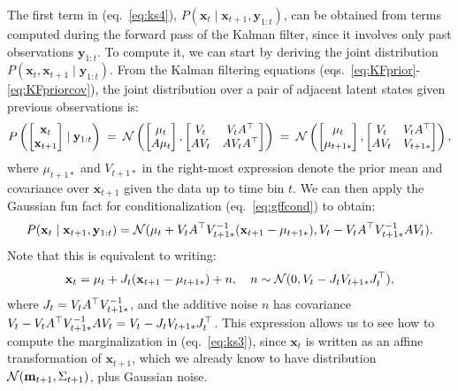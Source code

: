 \documentclass[10pt]{article}
\newcommand{\vx}{\mathbf{x}}
\newcommand{\vxto}{\mathbf{x}_{t+1}}
\newcommand{\vy}{\mathbf{y}}
\newcommand{\vm}{\mathbf{m}}
\begin{document}
The first term in (eq.~\ref{eq:ks4}),
$P(\vx_t \mid \vx_{t+1}, \vy_{1:t})$, can be obtained from terms
computed during the forward pass of the Kalman filter, since it
involves only past observations $\vy_{1:t}$.  To compute it, we can
start by deriving the joint distribution
$P(\vx_{t}, \vx_{t+1} \mid \vy_{1:t})$.  From the Kalman filtering
equations (eqs.~\ref{eq:KFprior}-\ref{eq:KFpriorcov}), the joint
distribution over a pair of adjacent latent states given previous
observations is:
\begin{align}
  \label{eq:8}
  P \left( \begin{bmatrix}
    \vx_t \\
    \vxto
  \end{bmatrix} \mid \vy_{1:t} \right) 
    \; = \; \Nrm \left(
  \begin{bmatrix}
    \mu_t \\ A \mu_t 
  \end{bmatrix}, 
  \begin{bmatrix}
    V_t & V_t A\trp \\
    A V_t & A V_t A\trp
   \end{bmatrix} \right)
\;  =\; \Nrm \left(
  \begin{bmatrix}
    \mu_t \\ \mu_{t+1*} 
  \end{bmatrix}, 
  \begin{bmatrix}
    V_t & V_t A\trp \\
    A V_t & V_{t+1*}
  \end{bmatrix} \right),
%
\end{align}
where $\mu_{t+1*}$ and $V_{t+1*}$ in the right-most expression denote
the prior mean and covariance over $\vxto$ given the data up to time
bin $t$. We can then apply the Gaussian fun fact for
conditionalization (eq.~\ref{eq:gffcond}) to obtain:
\begin{equation}
  \label{eq:7}
  P(\vx_t \mid \vxto, \vy_{1:t} )  = \Nrm( \mu_t + V_t A\trp
  V_{t+1*}\inv (\vxto - \mu_{t+1*}), V_t - V_t A\trp V_{t+1*}\inv A
  V_t ).
\end{equation}
Note that this is equivalent to writing:
\begin{equation}
  \label{eq:12}
    \vx_t =  \mu_t  + J_t (\vxto    -  \mu_{t+1*})  + n,
    \quad n \sim \Nrm(0, V_t - J_t V_{t+1*} J_t\trp ),
\end{equation}
where $ J_t = V_t A^\top V_{t+1*}^{-1}$, and the additive noise $n$ has
covariance
$V_t - V_t A^\top V_{t+1*}^{-1} A V_t = V_t - J_t V_{t+1*}
J_t^\top$. This expression allows us to see how to compute the
marginalization in (eq.~\ref{eq:ks3}), since $\vx_t$ is written as an
affine transformation of $\vx_{t+1}$, which we already know to have 
distribution $\Nrm(\vm_{t+1}, \Sigma_{t+1})$,  plus Gaussian noise.
\end{document}
